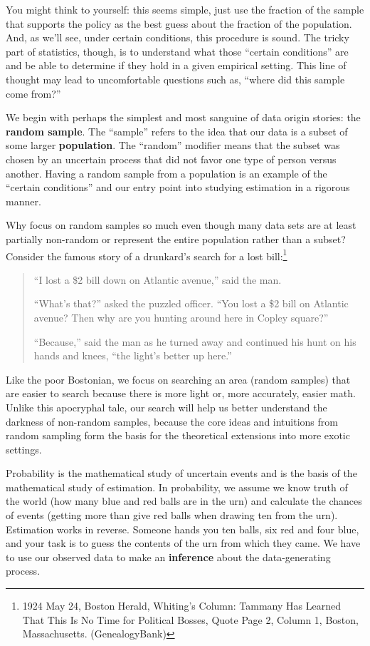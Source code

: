 \documentclass[
  letterpaper,
  DIV=11,
  numbers=noendperiod]{scrreprt}
\theoremstyle{definition}
\theoremstyle{plain}
\theoremstyle{definition}
\theoremstyle{remark}
\begin{document}
You might think to yourself: this seems simple, just use the fraction of
the sample that supports the policy as the best guess about the fraction
of the population. And, as we'll see, under certain conditions, this
procedure is sound. The tricky part of statistics, though, is to
understand what those ``certain conditions'' are and be able to
determine if they hold in a given empirical setting. This line of
thought may lead to uncomfortable questions such as, ``where did this
sample come from?''

We begin with perhaps the simplest and most sanguine of data origin
stories: the \textbf{random sample}. The ``sample'' refers to the idea
that our data is a subset of some larger \textbf{population}. The
``random'' modifier means that the subset was chosen by an uncertain
process that did not favor one type of person versus another. Having a
random sample from a population is an example of the ``certain
conditions'' and our entry point into studying estimation in a rigorous
manner.

Why focus on random samples so much even though many data sets are at
least partially non-random or represent the entire population rather
than a subset? Consider the famous story of a drunkard's search for a
lost bill:\footnote{1924 May 24, Boston Herald, Whiting's Column:
  Tammany Has Learned That This Is No Time for Political Bosses, Quote
  Page 2, Column 1, Boston, Massachusetts. (GenealogyBank)}

\begin{quote}
``I lost a \$2 bill down on Atlantic avenue,'' said the man.

``What's that?'' asked the puzzled officer. ``You lost a \$2 bill on
Atlantic avenue? Then why are you hunting around here in Copley
square?''

``Because,'' said the man as he turned away and continued his hunt on
his hands and knees, ``the light's better up here.''
\end{quote}

Like the poor Bostonian, we focus on searching an area (random samples)
that are easier to search because there is more light or, more
accurately, easier math. Unlike this apocryphal tale, our search will
help us better understand the darkness of non-random samples, because
the core ideas and intuitions from random sampling form the basis for
the theoretical extensions into more exotic settings.

Probability is the mathematical study of uncertain events and is the
basis of the mathematical study of estimation. In probability, we assume
we know truth of the world (how many blue and red balls are in the urn)
and calculate the chances of events (getting more than give red balls
when drawing ten from the urn). Estimation works in reverse. Someone
hands you ten balls, six red and four blue, and your task is to guess
the contents of the urn from which they came. We have to use our
observed data to make an \textbf{inference} about the data-generating
process.
\end{document}
